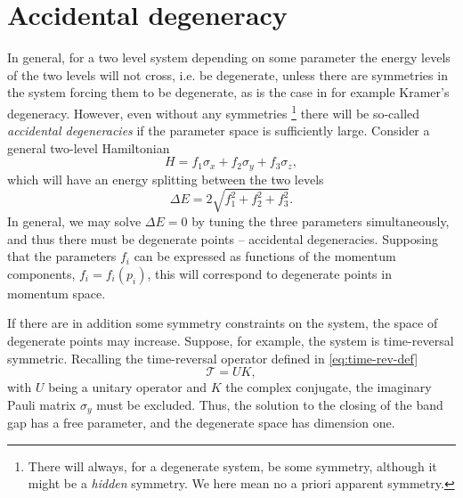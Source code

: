 \section{Accidental degeneracy}
\label{sec:accidental-degeneracy}
In general, for a two level system depending on some parameter the energy levels of the two levels will not cross, i.e. be degenerate, unless there are symmetries in the system forcing them to be degenerate, as is the case in for example Kramer's degeneracy.
However, even without any symmetries
\footnote{There will always, for a degenerate system, be some symmetry, although it might be a \emph{hidden} symmetry. We here mean no a priori apparent symmetry.}
there will be so-called \emph{accidental degeneracies} if the parameter space is sufficiently large.
Consider a general two-level Hamiltonian
\begin{equation}
  H = f_1 \sigma_x + f_2 \sigma_y + f_3 \sigma_z,
\end{equation}
which will have an energy splitting between the two levels
\begin{equation}
  \Delta E = 2 \sqrt{
    f_1^2 + f_2^2 + f_3^2
  }.
\end{equation}
In general, we may solve $\Delta E = 0$ by tuning the three parameters simultaneously, and thus there must be degenerate points -- accidental degeneracies.
Supposing that the parameters $f_i$ can be expressed as functions of the momentum components, $f_i =f_i(p_i)$, this will correspond to degenerate points in momentum space.

If there are in addition some symmetry constraints on the system, the space of degenerate points may increase.
Suppose, for example, the system is time-reversal symmetric.
Recalling the time-reversal operator defined in \cref{eq:time-rev-def}
$$
\mathcal{T} = UK,
$$
with $U$ being a unitary operator and $K$ the complex conjugate, the imaginary Pauli matrix $\sigma_y$ must be excluded.
Thus, the solution to the closing of the band gap has a free parameter, and the degenerate space has dimension one.
